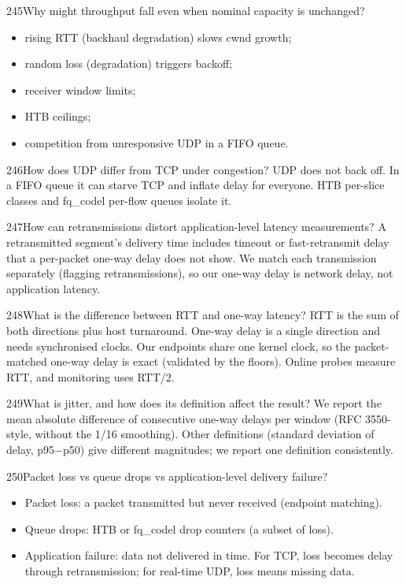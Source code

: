\begin{qa}{245}{Why might throughput fall even when nominal capacity is unchanged?}
\begin{itemize}
\item rising RTT (backhaul degradation) slows cwnd growth;
\item random loss (degradation) triggers backoff;
\item receiver window limits;
\item HTB ceilings;
\item competition from unresponsive UDP in a FIFO queue.
\end{itemize}
\end{qa}

\begin{qa}{246}{How does UDP differ from TCP under congestion?}
UDP does not back off. In a FIFO queue it can starve TCP and inflate delay for everyone. HTB per-slice classes and
fq\_codel per-flow queues isolate it.
\end{qa}

\begin{qa}{247}{How can retransmissions distort application-level latency measurements?}
A retransmitted segment's delivery time includes timeout or fast-retransmit delay that a per-packet one-way delay
does not show. We match each transmission separately (flagging retransmissions), so our one-way delay is network
delay, not application latency.
\end{qa}

\begin{qa}{248}{What is the difference between RTT and one-way latency?}
RTT is the sum of both directions plus host turnaround. One-way delay is a single direction and needs synchronised
clocks. Our endpoints share one kernel clock, so the packet-matched one-way delay is exact (validated by the floors).
Online probes measure RTT, and monitoring uses RTT/2.
\end{qa}

\begin{qa}{249}{What is jitter, and how does its definition affect the result?}
We report the mean absolute difference of consecutive one-way delays per window (RFC 3550-style, without the
1/16 smoothing). Other definitions (standard deviation of delay, p95$-$p50) give different magnitudes; we report one
definition consistently.
\end{qa}

\begin{qa}{250}{Packet loss vs queue drops vs application-level delivery failure?}
\begin{itemize}
\item Packet loss: a packet transmitted but never received (endpoint matching).
\item Queue drops: HTB or fq\_codel drop counters (a subset of loss).
\item Application failure: data not delivered in time. For TCP, loss becomes delay through retransmission; for
real-time UDP, loss means missing data.
\end{itemize}
\end{qa}


